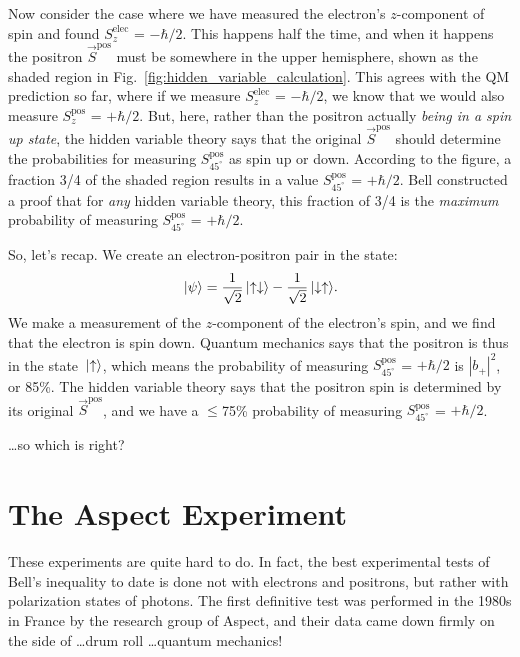 Now consider the case where we have measured the electron's $z$-component
of spin and found $S_z^\text{elec}$ = $-\hbar/2$.  This happens half
the time, and when it happens the positron $\vec S^\text{pos}$ must
be somewhere in the upper hemisphere, shown as the shaded region in
Fig.~\ref{fig:hidden_variable_calculation}.  This agrees with the QM
prediction so far, where if we measure $S_z^\text{elec}$ = $-\hbar/2$, we
know that we would also measure $S_z^\text{pos}$ = $+\hbar/2$.  But, here,
rather than the positron actually \emph{being in a spin up state}, the
hidden variable theory says that the original $\vec S^\text{pos}$ should
determine the probabilities for measuring  $S_{45^\circ}^\text{pos}$ as
spin up or down.  According to the figure, a fraction 3/4 of the shaded
region results in a value $S_{45^\circ}^\text{pos}$  = $+\hbar/2$.
Bell constructed a proof that for \emph{any} hidden variable theory,
this fraction of 3/4 is the \emph{maximum} probability of measuring
$S_{45^\circ}^\text{pos}$ = $+\hbar/2$.

So, let's recap.  We create an electron-positron pair in the state:
\begin{equation}
 \,|\mbox{$\psi$}\rangle = \frac{1}{\sqrt{2}}\,|\mbox{$\uparrow\downarrow$}\rangle
 - \frac{1}{\sqrt{2}}\,|\mbox{$\downarrow\uparrow$}\rangle.
\end{equation}
We make a measurement of the $z$-component of the electron's spin,
and we find that the electron is spin down.  Quantum mechanics says
that the positron is thus in the state $\,|\mbox{$\uparrow$}\rangle$, which means
the probability of measuring $S_{45^\circ}^\text{pos}$  = $+\hbar/2$
is $\left|b_+\right|^2$, or 85\%.  The hidden variable theory says that
the positron spin is determined by its original $\vec S^\text{pos}$, and
we have a $\le$75\% probability of measuring $S_{45^\circ}^\text{pos}$
= $+\hbar/2$.

\bigskip

\noindent\dots so which is right?

\section{The Aspect Experiment}

These experiments are quite hard to do.  In fact, the best
experimental tests of Bell's inequality to date is done not with
electrons and positrons, but rather with polarization states of
photons.  The first definitive test was performed in the 1980s in
France by the research group of Aspect, and their data came
down firmly on the side of \dots drum roll \dots quantum mechanics!  

